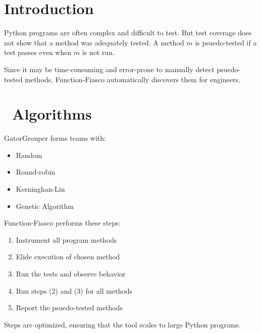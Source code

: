 \documentclass[a0paper,fleqn]{betterposter}
\begin{document}
{{  }

  \vspace*{-.5in}

  \section{Introduction}
  Python programs are often complex and difficult to test.
  But test coverage does not show that a method was adequately tested.
  A method $m$ is psuedo-tested if a test passes even when $m$ is not run.

  \vspace*{.25in}

  Since it may be time-consuming and error-prone to manually detect
  psuedo-tested methods, Function-Fiasco automatically discovers them for
  engineers.

  \vspace*{-.25in}
  \section{\faCog~Algorithms}
  GatorGrouper forms teams with:

  \begin{itemize}

    \item Random
    \item Round-robin
    \item Kerninghan-Lin
    \item Genetic Algorithm

  \end{itemize}

  \vspace*{.5in}
  Function-Fiasco performs these steps:

  \begin{enumerate}[leftmargin=.5in]

    \item Instrument all program methods
    \item Elide execution of chosen method
    \item Run the tests and observe behavior
    \item Run steps (2) and (3) for all methods
    \item Report the psuedo-tested methods

  \end{enumerate}

  \vspace*{.25in}
  Steps are optimized, ensuring that the tool scales to large Python programs.
  \vspace*{.5in}

}
\end{document}
